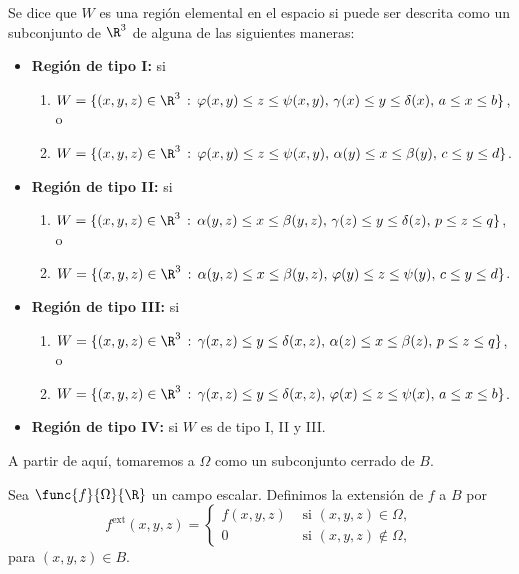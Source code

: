\documentclass[a4,11pt]{aleph-notas}
\begin{document}
\begin{defi}
    Se dice que $W$ es una región elemental en el espacio si puede ser descrita como un subconjunto de $\R^3$ de alguna de las siguientes maneras:
    \begin{itemize}
        \item \textbf{Región de tipo I:} si
        \begin{enumerate}[label=(\alph*)]
            \item $W=\{(x,y,z)\in\R^3 \, : \, \varphi(x,y) \leq z \leq \psi(x,y), \, \gamma(x)\leq y \leq \delta(x),\, a\leq x\leq b \}$, o
            \item $W=\{(x,y,z)\in\R^3 \, : \, \varphi(x,y) \leq z \leq \psi(x,y), \, \alpha(y)\leq x \leq \beta(y),\, c\leq y\leq d \}$.
        \end{enumerate}

        \item \textbf{Región de tipo II:} si
        \begin{enumerate}[label=(\alph*)]
            \item $W=\{(x,y,z)\in\R^3 \, : \, \alpha(y,z) \leq x \leq \beta(y,z), \, \gamma(z)\leq y \leq \delta(z),\, p\leq z\leq q \}$, o
            \item $W=\{(x,y,z)\in\R^3 \, : \, \alpha(y,z) \leq x \leq \beta(y,z), \, \varphi(y)\leq z \leq \psi(y),\, c\leq y\leq d \}$.
        \end{enumerate}

        \item \textbf{Región de tipo III:} si
        \begin{enumerate}[label=(\alph*)]
            \item $W=\{(x,y,z)\in\R^3 \, : \, \gamma(x,z) \leq y \leq \delta(x,z), \, \alpha(z)\leq x \leq \beta(z),\, p\leq z\leq q \}$, o
            \item $W=\{(x,y,z)\in\R^3 \, : \, \gamma(x,z) \leq y \leq \delta(x,z), \, \varphi(x)\leq z \leq \psi(x),\, a\leq x\leq b \}$.
        \end{enumerate}

        \item \textbf{Región de tipo IV:} si $W$ es de tipo I, II y III.
    \end{itemize}
\end{defi}

A partir de aquí, tomaremos a $\Omega$ como un subconjunto cerrado de $B$.

\begin{defi}
    Sea $\func{f}{\Omega}{\R}$ un campo escalar. Definimos la extensión de $f$ a $B$ por
    \[
        f^{\text{ext}}(x,y,z) = \begin{cases}
                          f(x,y,z) & \text{ si } (x,y,z)\in \Omega, \\
                          0 & \text{ si } (x,y,z) \not\in \Omega,
                         \end{cases}
    \]
    para $(x,y,z)\in B$.
\end{defi}
\end{document}
